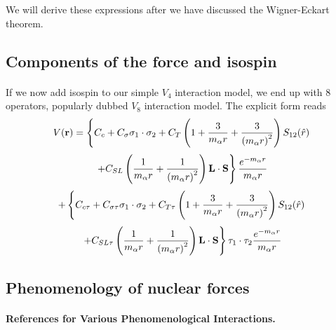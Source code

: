 \documentclass[%
twoside,                 %
final,                   %
10pt]{article}
\begin{document}
\noindent
We will derive these expressions after we have discussed the Wigner-Eckart theorem.






\subsection*{Components of the force and isospin}

\paragraph{}
If we now add isospin to our simple $V_4$ interaction model, we end up with $8$ operators, popularly dubbed $V_8$ interaction model. The explicit form reads
\[
V(\mathbf{r})= \left\{ C_c + C_\mathbf{\sigma} \mathbf{\sigma}_1\cdot\mathbf{\sigma}_2
 + C_T \left( 1 + {3\over m_\alpha r} + {3\over
\left(m_\alpha r\right)^2}\right) S_{12} (\hat r)\right. 
\]
\[
\left. + C_{SL} \left( {1\over m_\alpha r} + {1\over \left( m_\alpha r\right)^2}
\right) \mathbf{L}\cdot \mathbf{S}
\right\} \frac{e^{-m_\alpha r}}{m_\alpha r}
\]
\[
+ \left\{ C_{c\tau} + C_{\sigma\tau}\mathbf{\sigma}_1\cdot\mathbf{\sigma}_2
 + C_{T\tau} \left( 1 + {3\over m_\alpha r} + {3\over
\left(m_\alpha r\right)^2}\right) S_{12} (\hat r)\right. 
\]
\[
\left. + C_{SL\tau} \left( {1\over m_\alpha r} + {1\over \left( m_\alpha r\right)^2}
\right) \mathbf{L}\cdot \mathbf{S}
\right\}\mathbf{\tau}_1\cdot\mathbf{\tau}_2 \frac{e^{-m_\alpha r}}{m_\alpha r}
\]



\subsection*{Phenomenology of nuclear forces}

\paragraph{References for Various Phenomenological Interactions.}
\end{document}
